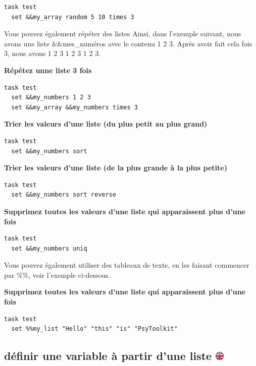 \documentclass[
]{book}
\begin{document}
\begin{verbatim}
task test
  set &&my_array random 5 10 times 3
\end{verbatim}

Vous pouvez également répéter des listes Ainsi, dans l'exemple suivant, nous avons une liste \&\&mes\_numéros avec le contenu 1 2 3. Après avoir fait cela fois 3, nous avons 1 2 3 1 2 3 1 2 3.

\textbf{Répétez unne liste 3 fois}

\begin{verbatim}
task test
  set &&my_numbers 1 2 3
  set &&my_array &&my_numbers times 3
\end{verbatim}

\textbf{Trier les valeurs d'une liste (du plus petit au plus grand)}

\begin{verbatim}
task test
  set &&my_numbers sort
\end{verbatim}

\textbf{Trier les valeurs d'une liste (de la plus grande à la plus petite)}

\begin{verbatim}
task test
  set &&my_numbers sort reverse
\end{verbatim}

\textbf{Supprimez toutes les valeurs d'une liste qui apparaissent plus d'une fois}

\begin{verbatim}
task test
  set &&my_numbers uniq
\end{verbatim}

Vous pouvez également utiliser des tableaux de texte, en les faisant commencer par \%\%, voir l'exemple ci-dessous.

\textbf{Supprimez toutes les valeurs d'une liste qui apparaissent plus d'une fois}

\begin{verbatim}
task test
  set %%my_list "Hello" "this" "is" "PsyToolkit"
\end{verbatim}

\hypertarget{duxe9finir-une-variable-uxe0-partir-dune-liste}{%
\subsection[définir une variable à partir d'une liste ]{\texorpdfstring{définir une variable à partir d'une liste \href{https://www.psytoolkit.org/doc3.4.0/syntax.html\#set_from_array}{\protect\includegraphics{img/ukflag.png}}}{définir une variable à partir d'une liste }}\label{duxe9finir-une-variable-uxe0-partir-dune-liste}}
\end{document}
